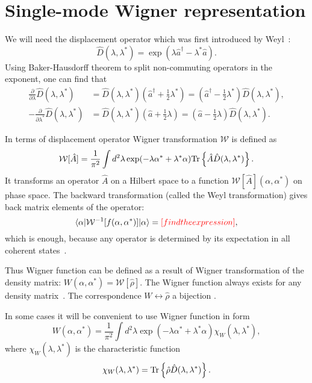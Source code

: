 \section{Single-mode Wigner representation}

We will need the displacement operator which was first introduced by Weyl~\cite{Weyl1950}:
\[
	\hat{D}(\lambda, \lambda^*) = \exp(\lambda \hat{a}^\dagger - \lambda^* \hat{a}).
\]
Using Baker-Hausdorff theorem to split non-commuting operators in the exponent,
one can find that
\begin{equation}
\label{eqn:formalism:sm-wigner:displacement-derivatives}
\begin{split}
	\frac{\partial}{\partial \lambda} \hat{D}(\lambda, \lambda^*)
	& = \hat{D}(\lambda, \lambda^*) (\hat{a}^\dagger + \frac{1}{2} \lambda^*)
	= (\hat{a}^\dagger - \frac{1}{2} \lambda^*) \hat{D}(\lambda, \lambda^*), \\
	-\frac{\partial}{\partial \lambda^*} \hat{D}(\lambda, \lambda^*)
	& = \hat{D}(\lambda, \lambda^*) (\hat{a} + \frac{1}{2} \lambda)
	= (\hat{a} - \frac{1}{2} \lambda) \hat{D}(\lambda, \lambda^*).
\end{split}
\end{equation}

In terms of displacement operator Wigner transformation $\mathcal{W}$ is defined as
\[
	\mathcal{W}[\hat{A}]
	= \frac{1}{\pi^2} \int d^2 \lambda \exp(-\lambda \alpha^* + \lambda^* \alpha)
		\mathrm{Tr} \left\{  \hat{A} \hat{D}(\lambda, \lambda^*)  \right\}.
\]
It transforms an operator $\hat{A}$ on a Hilbert space to a function $\mathcal{W}[\hat{A}](\alpha, \alpha^*)$ on phase space.
The backward transformation (called the Weyl transformation) gives back matrix elements of the operator:
\[
	\langle \alpha \lvert \mathcal{W}^{-1}[f(\alpha, \alpha^*)] \rvert \alpha \rangle
	= \textcolor{red}{[find the expression]},
\]
which is enough, because any operator is determined by its expectation in all coherent states~\cite{Gardiner2004}.

Thus Wigner function can be defined as a result of Wigner transformation of the density matrix: $W(\alpha, \alpha^*) = \mathcal{W}[\hat{\rho}]$.
The Wigner function always exists for any density matrix~\cite{Gardiner2004}.
The correspondence $W \leftrightarrow \hat{\rho}$ a bijection .

In some cases it will be convenient to use Wigner function in form~\cite{Gardiner2004}
\begin{equation}
\label{eqn:formalism:sm-wigner:w-definition}
	W (\alpha, \alpha^*)
	= \frac{1}{\pi^2} \int d^2 \lambda \exp(-\lambda \alpha^* + \lambda^* \alpha)
		\chi_W (\lambda, \lambda^*),
\end{equation}
where $\chi_W (\lambda, \lambda^*)$ is the characteristic function
\[
	\chi_W (\lambda, \lambda^*)
	= \mathrm{Tr} \left\{  \hat{\rho} \hat{D}(\lambda, \lambda^*)  \right\}.
\]

